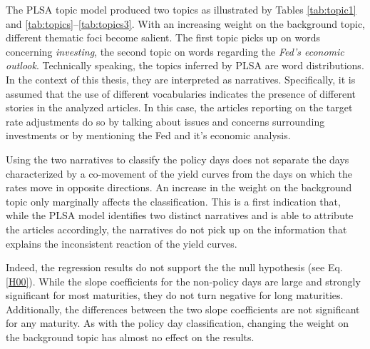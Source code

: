 \documentclass[11pt,a4paper,english,oneside]{book}
\numberwithin{equation}{chapter}
\begin{document}
The PLSA topic model produced two topics as illustrated by Tables \ref{tab:topic1} and \ref{tab:topics}--\ref{tab:topics3}. With an increasing weight on the background topic, different thematic foci become salient. The first topic picks up on words concerning \textit{investing}, the second topic on words regarding the \textit{Fed's economic outlook}. Technically speaking, the topics inferred by PLSA are word distributions. In the context of this thesis, they are interpreted as narratives. Specifically, it is assumed that the use of different vocabularies indicates the presence of different stories in the analyzed articles. In this case, the articles reporting on the target rate adjustments do so by talking about issues and concerns surrounding investments or by mentioning the Fed and it's economic analysis. 

Using the two narratives to classify the policy days does not separate the days characterized by a co-movement of the yield curves from the days on which the rates move in opposite directions. An increase in the weight on the background topic only marginally affects the classification. This is a first indication that, while the PLSA model identifies two distinct narratives and is able to attribute the articles accordingly, the narratives do not pick up on the information that explains the inconsistent reaction of the yield curves.

Indeed, the regression results do not support the the null hypothesis (see Eq. \ref{H00}). While the slope coefficients for the non-policy days are large and strongly significant for most maturities, they do not turn negative for long maturities. Additionally, the differences between the two slope coefficients are not significant for any maturity. As with the policy day classification, changing the weight on the background topic has almost no effect on the results. 
\end{document}
